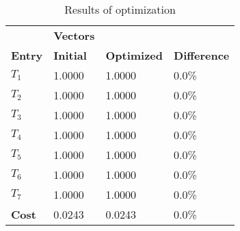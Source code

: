 \begin{table}[H]
\centering
\begin{tabular}{llll}
\textbf{}      & \cellcolor[HTML]{EFEFEF}\textbf{Vectors} & \textbf{} & \textbf{}         \\
\rowcolor[HTML]{EFEFEF} 
\textbf{Entry} & \textbf{Initial} & \textbf{Optimized} & \textbf{Difference} \\
$T_1$ & 1.0000 & 1.0000 & 0.0\% \\ 
$T_2$ & 1.0000 & 1.0000 & 0.0\% \\ 
$T_3$ & 1.0000 & 1.0000 & 0.0\% \\ 
$T_4$ & 1.0000 & 1.0000 & 0.0\% \\ 
$T_5$ & 1.0000 & 1.0000 & 0.0\% \\ 
$T_6$ & 1.0000 & 1.0000 & 0.0\% \\ 
$T_7$ & 1.0000 & 1.0000 & 0.0\% \\ 
\rowcolor[HTML]{EFEFEF} 
\textbf{Cost}  & 0.0243 & 0.0243 & 0.0\% \\ 
\end{tabular}
\caption{Results of optimization}
\label{tab:OptimizationAnalysis}
\end{table}